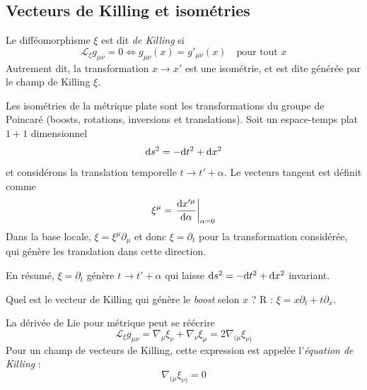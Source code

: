 \subsection{Vecteurs de Killing et isométries}
\begin{theoremframe}
    \begin{defi}
        Le difféomorphisme $\xi$ est dit \emph{de Killing} si 
        \begin{equation}
            \mathcal{L}_{\xi}g_{\mu \nu} = 0 \iff  g_{\mu \nu}(x) = g'_{\mu \nu}(x) \quad \text{pour tout $x$}
        \end{equation}
        Autrement dit, la transformation $x\to x'$ est une isométrie, et est dite générée par le champ de Killing $\xi$.
    \end{defi}
\end{theoremframe}
\begin{exmp}
    Les isométries de la métrique plate sont les transformations du groupe de Poincaré (boosts, rotations, inversions et translations). Soit un espace-temps plat $1+1$ dimensionnel 
    \begin{equation}
        \mathrm{d} s^2 = -\mathrm{d} t^2 + \mathrm{d} x^2
    \end{equation}  
    et considérons la translation temporelle $t \to t' + \alpha$. Le vecteurs tangent est définit comme
    \begin{equation}
        \xi^{\mu} = \left. \frac{\mathrm{d} x'^{\mu}}{\mathrm{d} \alpha}\right|_{\alpha = 0}
    \end{equation}
    Dans la base locale, $\xi = \xi^{\mu}\partial_{\mu}$ et donc  $\xi = \partial_{t}$ pour la transformation considérée, qui génère les translation dans cette direction.

    En résumé, $\xi = \partial_{t}$ génère  $t \rightarrow t' + \alpha$ qui laisse $\mathrm{d} s^2 = -\mathrm{d} t^2 + \mathrm{d} x^2$ invariant. 
\end{exmp}
\begin{exerc}
    Quel est le vecteur de Killing qui génère le \emph{boost} selon $x$ ? R : $\xi = x\partial_{t} + t\partial_{x}$.
\end{exerc}

\begin{theoremframe}
    \begin{propri}
        La dérivée de Lie pour métrique peut se réécrire
        \begin{equation}
            \mathcal{L}_{\xi}g_{\mu \nu} = \nabla_{\mu}\xi_{\nu} + \nabla_{\nu}\xi_{\mu} = 2\nabla_{(\mu}\xi_{\nu)}
        \end{equation}
        Pour un champ de vecteurs de Killing, cette expression est appelée l'\emph{équation de Killing} :
        \begin{equation}
            \boxed{\nabla_{(\mu}\xi_{\nu)} = 0}
        \end{equation}
    \end{propri}
\end{theoremframe}

